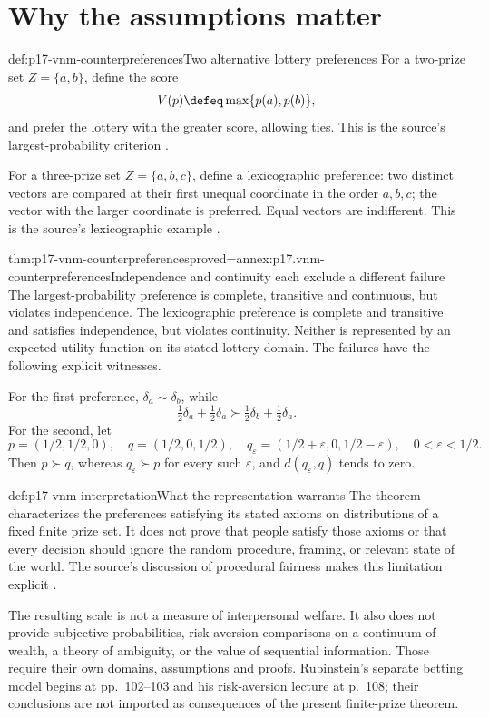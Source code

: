 \section{Why the assumptions matter}
\label{sec:p17-expected-utility-failures}

\begin{hbdefinition}{def:p17-vnm-counterpreferences}{Two alternative lottery preferences}
For a two-prize set \(Z=\{a,b\}\), define the score
\[
                       V(p)\defeq\max\{p(a),p(b)\},
\]
and prefer the lottery with the greater score, allowing ties. This is
the source's largest-probability criterion
\cite[pp.~95 and 99]{Rubinstein2015LectureNotes}.

For a three-prize set \(Z=\{a,b,c\}\), define a lexicographic preference:
two distinct vectors are compared at their first unequal coordinate in
the order \(a,b,c\); the vector with the larger coordinate is preferred.
Equal vectors are indifferent. This is the source's lexicographic example
\cite[pp.~96 and 99]{Rubinstein2015LectureNotes}.
\end{hbdefinition}

\begin{hbtheorem}{thm:p17-vnm-counterpreferences}{proved=annex:p17.vnm-counterpreferences}{Independence and continuity each exclude a different failure}
The largest-probability preference is complete, transitive and continuous,
but violates independence. The lexicographic preference is complete and
transitive and satisfies independence, but violates continuity.
Neither is represented by an expected-utility function on its stated
lottery domain. The failures have the following explicit witnesses.

For the first preference, \(\delta_a\sim\delta_b\), while
\[
 \tfrac12\delta_a+\tfrac12\delta_a
       \succ\tfrac12\delta_b+\tfrac12\delta_a.
\]
For the second, let
\[
 p=(1/2,1/2,0),\quad q=(1/2,0,1/2),\quad
 q_\varepsilon=(1/2+\varepsilon,0,1/2-\varepsilon),
                    \quad0<\varepsilon<1/2.
\]
Then \(p\succ q\), whereas \(q_\varepsilon\succ p\) for every such
\(\varepsilon\), and \(d(q_\varepsilon,q)\) tends to zero.
\end{hbtheorem}

\begin{hbwarning}{def:p17-vnm-interpretation}{What the representation warrants}
The theorem characterizes the preferences satisfying its stated axioms
on distributions of a fixed finite prize set. It does not prove that
people satisfy those axioms or that every decision should ignore the
random procedure, framing, or relevant state of the world. The source's
discussion of procedural fairness makes this limitation explicit
\cite[p.~102]{Rubinstein2015LectureNotes}.

The resulting scale is not a measure of interpersonal welfare. It also
does not provide subjective probabilities, risk-aversion comparisons on
a continuum of wealth, a theory of ambiguity, or the value of sequential
information. Those require their own domains, assumptions and proofs.
Rubinstein's separate betting model begins at pp.~102--103 and his
risk-aversion lecture at p.~108; their conclusions are not imported as
consequences of the present finite-prize theorem.
\end{hbwarning}
